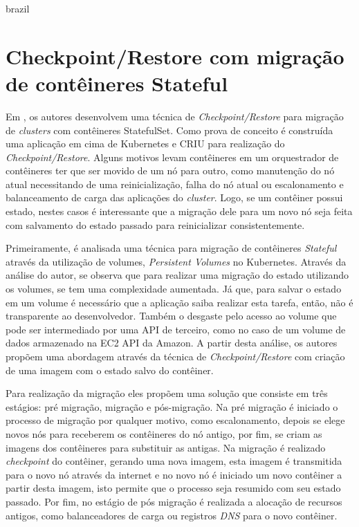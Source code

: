 \begin{otherlanguage*}{brazil}
\section{Checkpoint/Restore com migração de contêineres Stateful}

Em \cite{oh2018stateful}, os autores desenvolvem uma técnica de
\textit{Checkpoint/Restore} para migração de \textit{clusters} com contêineres
StatefulSet. Como prova de conceito é construída uma aplicação em cima de
Kubernetes e CRIU para realização do \textit{Checkpoint/Restore}. Alguns
motivos levam contêineres em um orquestrador de contêineres ter que ser
movido de um nó para outro, como manutenção do nó atual necessitando de uma
reinicialização, falha do nó atual ou escalonamento e balanceamento de carga
das aplicações do \textit{cluster}. Logo, se um contêiner possui estado,
nestes casos é interessante que a migração dele para um novo nó seja feita
com salvamento do estado passado para reinicializar consistentemente.

Primeiramente, é analisada uma técnica para migração de contêineres
\textit{Stateful} através da utilização de volumes, \textit{Persistent Volumes}
no Kubernetes. Através da análise do autor, se observa que para realizar
uma migração do estado utilizando os volumes, se tem uma complexidade aumentada.
Já que, para salvar o estado em um volume é necessário que a aplicação saiba
realizar esta tarefa, então, não é transparente ao desenvolvedor. Também o
desgaste pelo acesso ao volume que pode ser intermediado por uma API de terceiro,
como no caso de um volume de dados armazenado na EC2 API da Amazon. A partir
desta análise, os autores propõem uma abordagem através da técnica de
\textit{Checkpoint/Restore} com criação de uma imagem com o estado salvo do contêiner.

Para realização da migração eles propõem uma solução que consiste em três
estágios: pré migração, migração e pós-migração. Na pré migração é iniciado
o processo de migração por qualquer motivo, como escalonamento, depois se elege
novos nós para receberem os contêineres do nó antigo, por fim, se criam as
imagens dos contêineres para substituir as antigas. Na migração é realizado
\textit{checkpoint} do contêiner, gerando uma nova imagem, esta imagem é
transmitida para o novo nó através da internet e no novo nó é iniciado um
novo contêiner a partir desta imagem, isto permite que o processo seja
resumido com seu estado passado. Por fim, no estágio de pós migração é
realizada a alocação de recursos antigos, como balanceadores de carga ou
registros \textit{DNS} para o novo contêiner.


\end{otherlanguage*}
